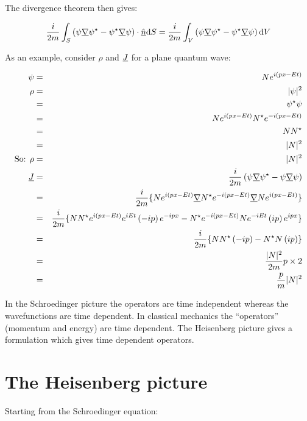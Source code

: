 The divergence theorem then gives:

\[
  \frac{i}{2m}\int_S\left(\psi\underline{\nabla}\psi^{\star} - \psi^{\star}\underline{\nabla}\psi\right)\cdot\underline{\hat{n}}\mathrm{d}S = \frac{i}{2m}\int_V\left(\psi\underline{\nabla}\psi^{\star} - \psi^{\star}\underline{\nabla}\psi\right)\mathrm{d}V
\]

As an example, consider $\rho$ and $\underline{J}$ for a plane quantum wave:

\begin{eqnarray*}
  \psi & = & Ne^{i\left(px - Et\right)} \\
  \rho & = & |\psi|^2 \\
       & = & \psi^{\star}\psi \\
       & = & Ne^{i\left(px - Et\right)}N^{\star}e^{-i\left(px - Et\right)} \\
       & = & NN^{\star} \\
       & = & |N|^2 \\
  \textrm{So: } \rho & = & |N|^2 \\
  \underline{J} & = & \frac{i}{2m}\left(\psi\underline{\nabla}\psi^{\star} - \psi\underline{\nabla}\psi\right) \\
       & = & \frac{i}{2m}\lbrace N e^{i\left(px - Et\right)}\underline{\nabla}N^{\star}e^{-i\left(px - Et\right)}\underline{\nabla}Ne^{i\left(px - Et\right)}\rbrace \\
       & = & \frac{i}{2m}\lbrace NN^{\star}e^{i\left(px - Et\right)}e^{iEt}\left(-ip\right)e^{-ipx}
             - N^{\star}e^{-i\left(px - Et\right)}Ne^{-iEt}\left(ip\right)e^{ipx}\rbrace \\
       & = & \frac{i}{2m}\lbrace NN^{\star}\left(-ip\right) - N^{\star}N\left(ip\right)\rbrace \\
       & = & \frac{|N|^2}{2m}p\times 2 \\
       & = & \frac{p}{m}|N|^2
\end{eqnarray*}

In the Schroedinger picture the operators are time independent whereas the wavefunctions are time dependent.  In classical mechanics the ``operators'' (momentum and energy) are time dependent.  The Heisenberg picture gives a formulation which gives time dependent operators.

\section{The Heisenberg picture}

Starting from the Schroedinger equation:


